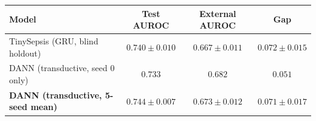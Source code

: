 \begin{tabular}{lccc}
\toprule
Model & Test AUROC & External AUROC & Gap \\
\midrule
TinySepsis (GRU, blind holdout) & $0.740 \pm 0.010$ & $0.667 \pm 0.011$ & $0.072 \pm 0.015$ \\
DANN (transductive, seed 0 only) & $0.733$ & $0.682$ & $0.051$ \\
\textbf{DANN (transductive, 5-seed mean)} & $0.744 \pm 0.007$ & $0.673 \pm 0.012$ & $0.071 \pm 0.017$ \\
\bottomrule
\end{tabular}
